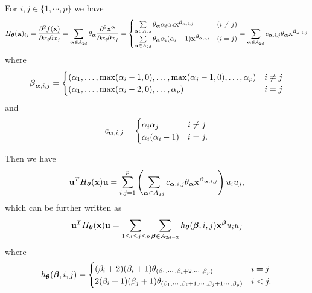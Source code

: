 \documentclass[11pt]{article}
\begin{document}
For $i, j\in\{1, \cdots, p\}$ we have
\begin{equation} \label{hessian}
H_{\boldsymbol\theta}({\bf x})_{ij} = \frac{\partial^2 f({\bf x})}{\partial x_i \partial x_j}  = \sum_{{\boldsymbol\alpha} \in A_{2d} } \theta_{\boldsymbol\alpha} \frac{\partial^2 {\bf x}^{\boldsymbol\alpha}}{\partial x_i \partial x_j} = 
\begin{cases}
\sum\limits_{{\boldsymbol\alpha} \in A_{2d} } \theta_{\boldsymbol\alpha} \alpha_i \alpha_j {\bf x}^{{\boldsymbol\beta}_{{\boldsymbol\alpha}, i,j}} & (i \not= j)\\
\sum\limits_{{\boldsymbol\alpha} \in A_{2d}} \theta_{\boldsymbol\alpha} \alpha_i (\alpha_i-1) {\bf x}^{{\boldsymbol\beta}_{{\boldsymbol\alpha}, i,i}} & (i = j)
\end{cases}
= \sum_{{\boldsymbol\alpha} \in A_{2d} } c_{{\boldsymbol\alpha}, i, j} \theta_{\boldsymbol\alpha}  {\bf x}^{{\boldsymbol\beta}_{{\boldsymbol\alpha}, i,j}}
\end{equation}
where
\begin{equation}\notag
{\boldsymbol\beta}_{{\boldsymbol\alpha}, i,j} =
\begin{cases}
 (\alpha_1, \dotsc, \max(\alpha_i-1, 0), \dotsc, \max(\alpha_j-1, 0), \dotsc, \alpha_p) & i \neq j\\
(\alpha_1, \dotsc, \max(\alpha_i-2, 0), \dotsc, \alpha_p) & i = j
\end{cases}
\end{equation}
and
\begin{equation}\notag
c_{{\boldsymbol\alpha}, i, j} =
\begin{cases}
\alpha_i \alpha_j  & i \not= j\\
\alpha_i (\alpha_i - 1)  & i = j.
\end{cases}
\end{equation}

Then we have
\begin{equation}\notag
{\bf u}^TH_{\boldsymbol\theta}({\bf x}){\bf u} = \sum_{i,j=1}^p \left( \sum_{{\boldsymbol\alpha} \in A_{2d}} c_{{\boldsymbol\alpha}, i, j} \theta_{\boldsymbol\alpha}  {\bf x}^{{\boldsymbol\beta}_{{\boldsymbol\alpha}, i,j}} \right) u_iu_j,
\end{equation}
which can be further written as
\begin{equation} \label{lhs}
{\bf u}^TH_{\boldsymbol\theta}({\bf x}){\bf u} = \sum_{1 \le i \le j \le p}  \sum_{{\boldsymbol\beta} \in A_{2d - 2}} h_{\boldsymbol\theta} ({\boldsymbol\beta}, i, j) {\bf x}^{{\boldsymbol\beta}}  u_iu_j
\end{equation}
where
\begin{equation}\notag
h_{\boldsymbol\theta} ({\boldsymbol\beta}, i, j) =
\begin{cases}
(\beta_i + 2) (\beta_i + 1) \theta_{(\beta_1, \cdots, \beta_i + 2, \cdots, \beta_p)} & i = j\\
2(\beta_i + 1) (\beta_j + 1) \theta_{(\beta_1, \cdots, \beta_i + 1, \cdots, \beta_j + 1 \cdots, \beta_p)} & i < j.
\end{cases}
\end{equation}
\end{document}
